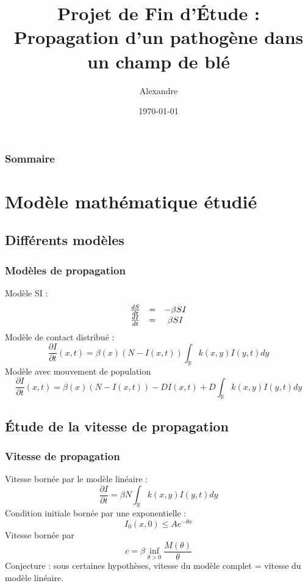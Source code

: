 \documentclass[handout]{beamer}
\title[PFE]{Projet de Fin d'Étude : \\ Propagation d'un pathogène dans un champ de blé}
\author{Alexandre \bsc{Vieira}}
\institute{INSA de Rouen}
\date{\today}
\newcommand{\derPar}[2]{\frac{\partial #1}{\partial #2}}
\begin{document}
\begin{frame}
\titlepage
\end{frame}

\begin{frame}
	\frametitle{Sommaire}
	\tableofcontents
\end{frame}

\section[Modèle]{Modèle mathématique étudié}
\subsection[Diff. modèles]{Différents modèles}
\begin{frame}
	\frametitle{Modèles de propagation}
Modèle SI :
\[\begin{array}{c c c}
	\frac{dS}{dt}&=&-\beta SI\\
	\frac{dI}{dt}&=&\beta SI
\end{array}\]
Modèle de contact distribué :
\begin{equation} \label{eqKot}
	\derPar{I}{t}(x,t)=\beta(x)(N-I(x,t))\int_{\mathbb{R}}k(x,y)I(y,t) dy
\end{equation}
Modèle avec mouvement de population
\begin{equation}
	\derPar{I}{t}(x,t)=\beta(x)(N-I(x,t))-DI(x,t)+D\int_{\mathbb{R}}k(x,y)I(y,t) dy
\end{equation}
\end{frame}

\subsection[Vitesse]{Étude de la vitesse de propagation}
\begin{frame}
	\frametitle{Vitesse de propagation}
Vitesse bornée par le modèle linéaire :
\[\derPar{I}{t}=\beta N\int_{\mathbb{R}}k(x,y)I(y,t) dy\]
Condition initiale bornée par une exponentielle :
\[I_0(x,0)\leq Ae^{-\theta x}\]	
Vitesse bornée par
\begin{equation}\label{bornVit}
	c=\beta \inf_{\theta>0}\frac{M(\theta)}{\theta}
\end{equation}
Conjecture : sous certaines hypothèses, vitesse du modèle complet = vitesse du modèle linéaire.
\end{frame}
\end{document}
